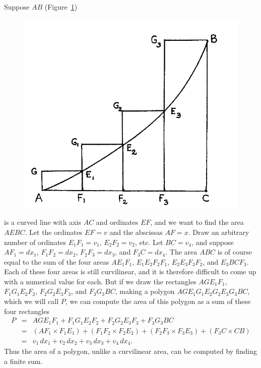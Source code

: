 \documentclass[twoside,openright]{article}
\newlength{\oldjot}
\begin{document}
\label{meas} Suppose $AB$ (Figure~\ref{areasum})
\begin{figure}[htp]
\begin{center}
\includegraphics[width=.75\textwidth]{fig/Figure35}
\caption{}
\label{areasum}
\vspace{-10pt}
\end{center}
\end{figure} is a curved line with axis $AC$ and ordinates $EF$, and
we want to find the area $AEBC$.  Let the ordinates $EF =v$ and the
abscissas $AF=x$.  Draw an arbitrary number of ordinates $E_1F_1=v_1$,
$E_2F_2=v_2$, etc.  Let $BC=v_4$, and suppose $AF_1=dx_1$,
$F_1F_2 =dx_2$, $F_2F_3= dx_3$, and $F_3C = dx_4$.  The area $ABC$ is
of course equal to the sum of the four areas $AE_1F_1$,
$E_1E_2F_2F_1$, $E_2E_3F_3F_2$, and $E_3BCF_3$.  Each of these four
areas is still curvilinear, and it is therefore difficult to come up
with a numerical value for each. But if we draw the rectangles
$AGE_1F_1$, $F_1G_1E_2F_2$, $F_2G_2E_3F_3$, and $F_3G_3BC$, making a
polygon $AGE_1G_1E_2G_2E_3G_3BC$, which we will call $P$, we can
compute the area of this polygon as a sum of these four rectangles
\setlength{\jot}{1.5ex}
\begin{eqnarray*}
  P & =  & AGE_1F_1 + F_1G_1E_2F_2 + F_2G_2E_3F_3 + F_3G_3BC\\
    & = & (AF_1 \times F_1E_1) + (F_1F_2\times F_2E_2) + (F_2F_3 \times F_3E_3) + (F_3C \times CB)\\
    & = & v_1\,dx_1 + v_2\,dx_2 + v_3\,dx_3 + v_4\,dx_4.
\end{eqnarray*}
\setlength{\jot}{\oldjot}
\hspace{-.35em}Thus the area of a polygon, unlike a curvilinear area,
can be computed by finding a finite sum.
\end{document}
